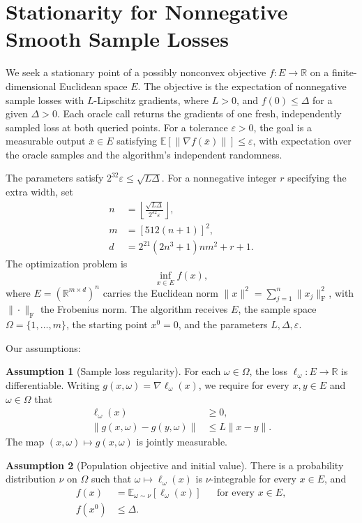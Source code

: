 \documentclass[10pt]{article}
\theoremstyle{definition}
\newtheorem{assumption}{Assumption}
\begin{document}
\section*{Stationarity for Nonnegative Smooth Sample Losses}
We seek a stationary point of a possibly nonconvex objective $f:E\to\mathbb{R}$ on a finite-dimensional Euclidean space $E$. The objective is the expectation of nonnegative sample losses with $L$-Lipschitz gradients, where $L>0$, and $f(0)\leq\Delta$ for a given $\Delta>0$. Each oracle call returns the gradients of one fresh, independently sampled loss at both queried points. For a tolerance $\varepsilon>0$, the goal is a measurable output $\bar{x}\in E$ satisfying $\mathbb{E}[\|\nabla f(\bar{x})\|]\leq\varepsilon$, with expectation over the oracle samples and the algorithm's independent randomness.

The parameters satisfy $2^{32}\varepsilon\leq\sqrt{L\Delta}$. For a nonnegative integer $r$ specifying the extra width, set
\[
\begin{aligned}
n&=\left\lfloor\frac{\sqrt{L\Delta}}{2^{32}\varepsilon}\right\rfloor,\\
m&=[512(n+1)]^2,\\
d&=2^{21}(2n^3+1)n m^2+r+1.
\end{aligned}
\]
The optimization problem is
\[
\inf_{x\in E} f(x),
\]
where $E=(\mathbb{R}^{m\times d})^n$ carries the Euclidean norm $\|x\|^2=\sum_{j=1}^n\|x_j\|_{\mathrm F}^2$, with $\|\cdot\|_{\mathrm F}$ the Frobenius norm. The algorithm receives $E$, the sample space $\Omega=\{1,\ldots,m\}$, the starting point $x^0=0$, and the parameters $L,\Delta,\varepsilon$.

Our assumptions:
\begin{assumption}[Sample loss regularity]
For each $\omega\in\Omega$, the loss $\ell_\omega:E\to\mathbb{R}$ is differentiable. Writing $g(x,\omega)=\nabla\ell_\omega(x)$, we require for every $x,y\in E$ and $\omega\in\Omega$ that
\[
\begin{aligned}
\ell_\omega(x)&\geq 0,\\
\|g(x,\omega)-g(y,\omega)\|&\leq L\|x-y\|.
\end{aligned}
\]
The map $(x,\omega)\mapsto g(x,\omega)$ is jointly measurable.
\end{assumption}

\begin{assumption}[Population objective and initial value]
There is a probability distribution $\nu$ on $\Omega$ such that $\omega\mapsto\ell_\omega(x)$ is $\nu$-integrable for every $x\in E$, and
\[
\begin{aligned}
f(x)&=\mathbb{E}_{\omega\sim\nu}[\ell_\omega(x)] &&\text{for every }x\in E,\\
f(x^0)&\leq\Delta.
\end{aligned}
\]
\end{assumption}
\end{document}
